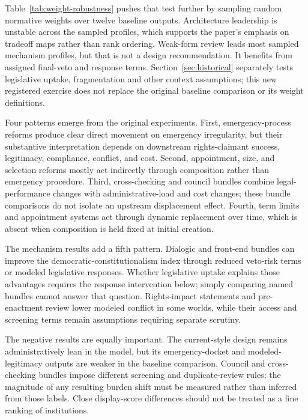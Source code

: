 \documentclass[
  journal=small,
  manuscript=research-article,
  year=2026
]{cup-journal}
\begin{document}


Table~\ref{tab:weight-robustness} pushes that test further by sampling random normative weights over twelve baseline outputs. Architecture leadership is unstable across the sampled profiles, which supports the paper's emphasis on tradeoff maps rather than rank ordering. Weak-form review leads most sampled mechanism profiles, but that is not a design recommendation. It benefits from assigned final-veto and response terms. Section~\ref{sec:historical} separately tests legislative uptake, fragmentation and other context assumptions; this new registered exercise does not replace the original baseline comparison or its weight definitions.



Four patterns emerge from the original experiments. First, emergency-process reforms produce clear direct movement on emergency irregularity, but their substantive interpretation depends on downstream rights-claimant success, legitimacy, compliance, conflict, and cost. Second, appointment, size, and selection reforms mostly act indirectly through composition rather than emergency procedure. Third, cross-checking and council bundles combine legal-performance changes with administrative-load and cost changes; these bundle comparisons do not isolate an upstream displacement effect. Fourth, term limits and appointment systems act through dynamic replacement over time, which is absent when composition is held fixed at initial creation.

The mechanism results add a fifth pattern. Dialogic and front-end bundles can improve the democratic-constitutionalism index through reduced veto-risk terms or modeled legislative responses. Whether legislative uptake explains those advantages requires the response intervention below; simply comparing named bundles cannot answer that question. Rights-impact statements and pre-enactment review lower modeled conflict in some worlds, while their access and screening terms remain assumptions requiring separate scrutiny.

The negative results are equally important. The current-style design remains administratively lean in the model, but its emergency-docket and modeled-legitimacy outputs are weaker in the baseline comparison. Council and cross-checking bundles impose different screening and duplicate-review rules; the magnitude of any resulting burden shift must be measured rather than inferred from those labels. Close display-score differences should not be treated as a fine ranking of institutions.
\end{document}
